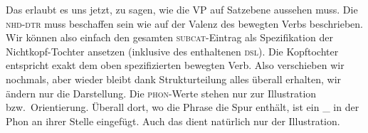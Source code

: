 \documentclass[10pt,a3paper]{article}
\newcommand{\blau}[1]{\textcolor{blau}{#1}}
\newcommand{\orongsch}[1]{\textcolor{orongsch}{#1}}
\newcommand{\Sub}[1]{\ensuremath{_{\text{#1}}}}
\newcommand{\Zeile}{\vspace{\baselineskip}}
\begin{document}
\Zeile


\newpage

Das erlaubt es uns jetzt, zu sagen, wie die VP auf Satzebene aussehen muss.
Die \textsc{nhd-dtr} muss beschaffen sein wie auf der Valenz des bewegten Verbs beschrieben.
Wir können also einfach den gesamten \orongsch{\textsc{subcat}-Eintrag} als Spezifikation der Nichtkopf-Tochter ansetzen (inklusive des enthaltenen \blau{\textsc{dsl}}).
Die Kopftochter entspricht exakt dem oben spezifizierten bewegten Verb.
Also verschieben wir nochmals, aber wieder bleibt dank Strukturteilung alles überall erhalten, wir ändern nur die Darstellung.
Die \textsc{phon}-Werte stehen nur zur Illustration bzw.\ Orientierung.
Überall dort, wo die Phrase die Spur enthält, ist ein \_ in der Phon an ihrer Stelle eingefügt.
Auch das dient natürlich nur der Illustration.

\Zeile
\end{document}
